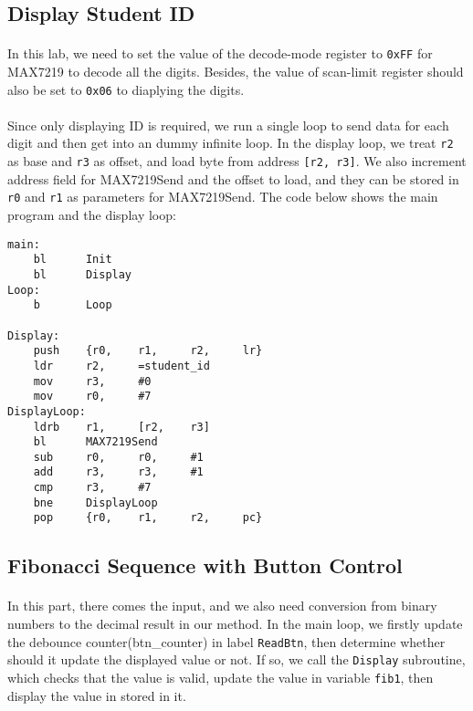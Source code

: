 \subsection{Display Student ID}
\paragraph{}
In this lab, we need to set the value of the decode-mode register to \texttt{0xFF} for MAX7219 to decode all the digits.
Besides, the value of scan-limit register should also be set to \texttt{0x06} to diaplying the digits.
\paragraph{}
Since only displaying ID is required, we run a single loop to send data for each digit and then get into an dummy infinite loop.
In the display loop, we treat \texttt{r2} as base and \texttt{r3} as offset, and load byte from address \texttt{[r2, r3]}. 
We also increment address field for MAX7219Send and the offset to load, and they can be stored in \texttt{r0} and \texttt{r1} as parameters for MAX7219Send.
The code below shows the main program and the display loop:
\begin{lstlisting}
main:
    bl      Init
    bl      Display
Loop:
    b       Loop

Display:
    push    {r0,    r1,     r2,     lr}
    ldr     r2,     =student_id
    mov     r3,     #0
    mov     r0,     #7
DisplayLoop:
    ldrb    r1,     [r2,    r3]
    bl      MAX7219Send
    sub     r0,     r0,     #1
    add     r3,     r3,     #1
    cmp     r3,     #7
    bne     DisplayLoop
    pop     {r0,    r1,     r2,     pc}
\end{lstlisting}
\subsection{Fibonacci Sequence with Button Control}
\paragraph{}
In this part, there comes the input, and we also need conversion from binary numbers to the decimal result in our method.
In the main loop, we firstly update the debounce counter(btn\_counter) in label \texttt{ReadBtn},
then determine whether should it update the displayed value or not.
If so, we call the \texttt{Display} subroutine, which checks that the value is valid,
update the value in variable \texttt{fib1}, then display the value in stored in it.
